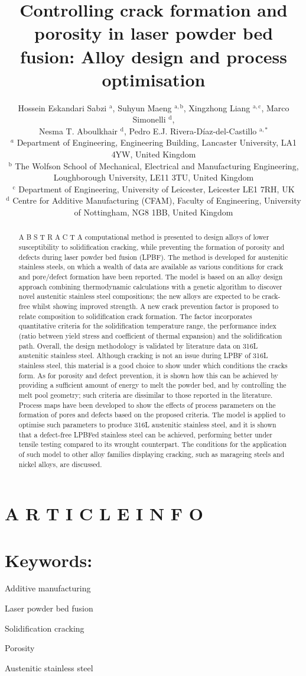 \documentclass[10pt]{article}
\title{Controlling crack formation and porosity in laser powder bed fusion: Alloy design and process optimisation }
\author{Hossein Eskandari Sabzi ${ }^{\mathrm{a}}$, Suhyun Maeng ${ }^{\mathrm{a}, \mathrm{b}}$, Xingzhong Liang ${ }^{\mathrm{a}, \mathrm{c}}$, Marco Simonelli ${ }^{\mathrm{d}}$,\\
Nesma T. Aboulkhair ${ }^{\mathrm{d}}$, Pedro E.J. Rivera-Díaz-del-Castillo ${ }^{\mathrm{a}, *}$\\
${ }^{a}$ Department of Engineering, Engineering Building, Lancaster University, LA1 4YW, United Kingdom\\
${ }^{\mathrm{b}}$ The Wolfson School of Mechanical, Electrical and Manufacturing Engineering, Loughborough University, LE11 3TU, United Kingdom\\
${ }^{\mathrm{c}}$ Department of Engineering, University of Leicester, Leicester LE1 7RH, UK\\
${ }^{\mathrm{d}}$ Centre for Additive Manufacturing (CFAM), Faculty of Engineering, University of Nottingham, NG8 1BB, United Kingdom}
\date{}
\begin{document}
\maketitle


\section*{A R T I C L E I N F O}
\section*{Keywords:}
Additive manufacturing

Laser powder bed fusion

Solidification cracking

Porosity

Austenitic stainless steel

\begin{abstract}
A B S T R A C T A computational method is presented to design alloys of lower susceptibility to solidification cracking, while preventing the formation of porosity and defects during laser powder bed fusion (LPBF). The method is developed for austenitic stainless steels, on which a wealth of data are available as various conditions for crack and pore/defect formation have been reported. The model is based on an alloy design approach combining thermodynamic calculations with a genetic algorithm to discover novel austenitic stainless steel compositions; the new alloys are expected to be crack-free whilst showing improved strength. A new crack prevention factor is proposed to relate composition to solidification crack formation. The factor incorporates quantitative criteria for the solidification temperature range, the performance index (ratio between yield stress and coefficient of thermal expansion) and the solidification path. Overall, the design methodology is validated by literature data on 316L austenitic stainless steel. Although cracking is not an issue during LPBF of 316L stainless steel, this material is a good choice to show under which conditions the cracks form. As for porosity and defect prevention, it is shown how this can be achieved by providing a sufficient amount of energy to melt the powder bed, and by controlling the melt pool geometry; such criteria are dissimilar to those reported in the literature. Process maps have been developed to show the effects of process parameters on the formation of pores and defects based on the proposed criteria. The model is applied to optimise such parameters to produce 316L austenitic stainless steel, and it is shown that a defect-free LPBFed stainless steel can be achieved, performing better under tensile testing compared to its wrought counterpart. The conditions for the application of such model to other alloy families displaying cracking, such as marageing steels and nickel alloys, are discussed.
\end{abstract}
\end{document}
